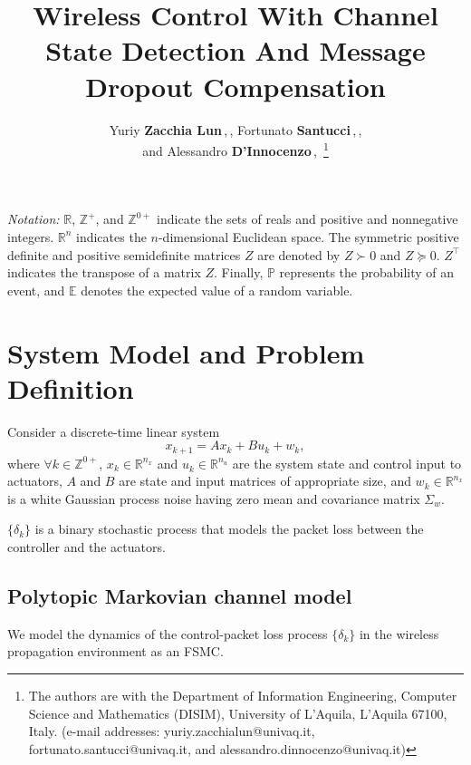 \documentclass[journal,twoside,web]{ieeecolor}
\title{Wireless Control With Channel State Detection And Message Dropout Compensation}
\author{Yuriy \textbf{Zacchia Lun}\,\textsuperscript{\orcidlink{0000-0002-9408-8773}},\,\IEEEmembership{Member, IEEE}, Fortunato \textbf{Santucci}\,\textsuperscript{\orcidlink{0000-0002-0229-6277}},\,\IEEEmembership{Senior Member, IEEE},\\ and Alessandro \textbf{D'Innocenzo}\,\textsuperscript{\orcidlink{0000-0002-5239-0894}},\,\IEEEmembership{Member, IEEE}
\thanks{The authors are with the 
Department of Information Engineering, Computer Science and Mathematics (DISIM), University of L'Aquila, L'Aquila 67100, Italy. (e-mail addresses:
        {yuriy.zacchialun@univaq.it},\\ {fortunato.santucci@univaq.it}, and {alessandro.dinnocenzo@univaq.it})}%
}
\begin{document}
\maketitle
\thispagestyle{empty}
\pagestyle{empty}

\textit{Notation:} $\mathbb{R}$, $\mathbb{Z}^{+}$, and $\mathbb{Z}^{0+}$ indicate the sets of reals and positive and nonnegative integers. $\mathbb{R}^{n}$ indicates the $n$-dimensional Euclidean space. The symmetric positive definite and positive semidefinite matrices $Z$ are denoted by $Z\succ 0$ and $Z\succeq 0$. $Z^{\top}$ indicates the transpose of a matrix $Z$. Finally, $\mathbb{P}$ represents the probability of an event, and $\mathbb{E}$ denotes the expected value of a random variable.
\section{System Model and Problem Definition}\label{sec:model}
Consider a discrete-time linear system
\begin{equation}\label{eq:state}
        x_{k+1} = A x_{k} + B u_{k}^{} + w_{k},
\end{equation}
where $\forall k \!\in\! \mathbb{Z}^{0+}$, $x_k\!\in\!\mathbb{R}^{n_x}$ and $u_k^{}\!\in\!\mathbb{R}^{n_u}$ are the system state and control input to actuators, $A$ and $B$ are state and input matrices of appropriate size, and $w_k\!\in\!\mathbb{R}^{n_x}$ is a white Gaussian process noise having zero mean and covariance matrix $\Sigma_w$.

$\{\delta_k\}$ is a binary stochastic process that models the packet loss between the controller and the actuators.

\subsection{Polytopic Markovian channel model}\label{subsec:ptifsmc}
We model the dynamics of the control-packet loss process $\{\delta_k\}$ in the wireless propagation environment as an FSMC. 
\end{document}
